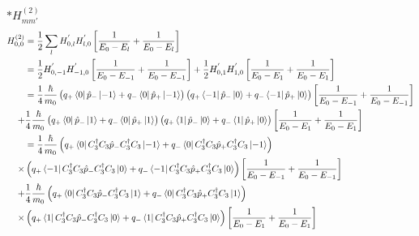 \documentclass{report}
\newcommand{\f}[2]{\dfrac{#1}{#2}}
\begin{document}
$\ast H^{(2)}_{mm'}$
\begin{align*}
	H_{0,0}^{(2)}
	       & = \f{1}{2} \sum_{l} H_{0,l}^{'}H_{l,0}^{'}\left[ \f{1}{ E_{0} - E_{l}} + \f{1}{ E_{0} - E_{l} } \right]                                                                                                                                                                                      \\
	       & = \f{1}{2} H_{0,-1}^{'}H_{-1,0}^{'}\left[ \f{1}{ E_{0} - E_{-1}} + \f{1}{ E_{0} - E_{-1} } \right] +                                                                                            \f{1}{2} H_{0,1}^{'}H_{1,0}^{'}\left[ \f{1}{ E_{0} - E_{1}} + \f{1}{ E_{0} - E_{1} } \right] \\
	       & = \f{1}{4}\f{\hbar}{m_0} \left( q_{+}\bra{0}\hat{p}_{-}\ket{-1} + q_{-}\bra{0}\hat{p}_{+}\ket{-1}\right)\left( q_{+}\bra{-1}\hat{p}_{-}\ket{0} + q_{-}\bra{-1}\hat{p}_{+}\ket{0}\right)\left[ \f{1}{ E_{0} - E_{-1}} + \f{1}{ E_{0} - E_{-1} } \right]                                       \\
	+      & \f{1}{4}\f{\hbar}{m_0} \left( q_{+}\bra{0}\hat{p}_{-}\ket{1} + q_{-}\bra{0}\hat{p}_{+}\ket{1}\right)\left( q_{+}\bra{1}\hat{p}_{-}\ket{0} + q_{-}\bra{1}\hat{p}_{+}\ket{0}\right)\left[ \f{1}{ E_{0} - E_{1}} + \f{1}{ E_{0} - E_{1} } \right]                                               \\
	       & = \f{1}{4}\f{\hbar}{m_0} \left( q_{+}\bra{0}C_{3}^{\dagger}C_{3}\hat{p}_{-}C_{3}^{\dagger}C_{3}\ket{-1} + q_{-}\bra{0}C_{3}^{\dagger}C_{3}\hat{p}_{+}C_{3}^{\dagger}C_{3}\ket{-1}\right)                                                                                                     \\
	\times & \left( q_{+}\bra{-1}C_{3}^{\dagger}C_{3}\hat{p}_{-}C_{3}^{\dagger}C_{3}\ket{0} + q_{-}\bra{-1}C_{3}^{\dagger}C_{3}\hat{p}_{+}C_{3}^{\dagger}C_{3}\ket{0}\right) \left[ \f{1}{ E_{0} - E_{-1}} + \f{1}{ E_{0} - E_{-1} } \right]                                                              \\
	+      & \f{1}{4}\f{\hbar}{m_0} \left( q_{+}\bra{0}C_{3}^{\dagger}C_{3}\hat{p}_{-}C_{3}^{\dagger}C_{3}\ket{1} + q_{-}\bra{0}C_{3}^{\dagger}C_{3}\hat{p}_{+}C_{3}^{\dagger}C_{3}\ket{1}\right)                                                                                                         \\
	\times & \left( q_{+}\bra{1}C_{3}^{\dagger}C_{3}\hat{p}_{-}C_{3}^{\dagger}C_{3}\ket{0} + q_{-}\bra{1}C_{3}^{\dagger}C_{3}\hat{p}_{+}C_{3}^{\dagger}C_{3}\ket{0}\right)\left[ \f{1}{ E_{0} - E_{1}} + \f{1}{ E_{0} - E_{1} } \right]                                                                   \\

\end{align*}
\end{document}
